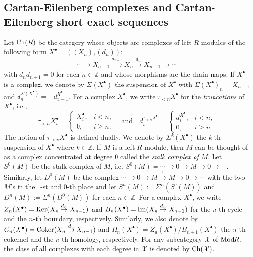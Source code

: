 \documentclass[reqno,12pt]{amsart}
\numberwithin{equation}{section}
\def\Ker{\mbox{\rm Ker}} \def\im{\mbox{\rm Im}} \def\Coker{\mbox{\rm Coker}}\def\mod{\mbox{\rm mod}}
\def\Im{\mbox{\rm Im}} \def\id{\mbox{\rm id}} \def\wid{\mbox{\rm w{\text -}id}} \def\FPid{\mbox{\rm FP{\text -}id}}
\def\Ch{\mbox{\rm Ch}}
\theoremstyle{plain}
\theoremstyle{definition}
\begin{document}
\subsection{Cartan-Eilenberg complexes and Cartan-Eilenberg short exact sequences}
Let $\Ch (R)$ be the category whose objects are complexes of left
$R$-modules of the following form $X^{\bullet}=((X_n),(d_n))$: $$ \cdots\to X_{n+1}
\stackrel{d_{n+1}}\longrightarrow X_n\stackrel{d_{n}}\longrightarrow X_{n-1}\to \cdots$$ with $d_{n}d_{n+1}=0$ for each
$n\in\mathbb{Z}$ and whose morphisms are the chain maps. If $X^{\bullet}$ is a complex, we
denote by $\Sigma(X^{\bullet})$ the suspension of $X^{\bullet}$ with
$\Sigma(X^{\bullet})_n=X_{n-1}$ and $d^{\Sigma(X^{\bullet})}_n=-d_{n-1}^{X^{\bullet}}$.
For a complex $X^{\bullet}$, we write $\tau_{<n}X^{\bullet}$ for the {\it truncations} of
$X^{\bullet}$, i.e.,
\begin{equation*}
    \tau_{<n}X^{\bullet}_i=\begin{cases}
        X^{\bullet}_i, & i<n, \\
        0, & i\geq n.
    \end{cases} \quad \text{and} \quad     d_i^{\tau_{<n}X^{\bullet}}=\begin{cases}
        d^{X^{\bullet}}_i, & i<n, \\
        0, & i\geq n.
    \end{cases}
\end{equation*}
The notion of $\tau_{>n}X^{\bullet}$ is defined dually.
We denote by $\Sigma^k(X^{\bullet})$ the $k$-th suspension of $X^{\bullet}$ where
$k\in\mathbb{Z}$. If $M$ is a left $R$-module, then $M$ can be thought of as a complex
concentrated at degree $0$ called the {\it stalk complex of $M$}.
Let $S^0(M)$ be the stalk complex of $M$, i.e. $S^0(M)=\cdots \to 0\to M\to 0\to \cdots$.
Similarly, let $D^0(M)$ be the complex $\cdots\to 0\to M\stackrel{1}\to M\to 0\to \cdots$ with
the two $M$'s in the $1$-st and $0$-th place and let $S^n(M):=\Sigma^n(S^0(M))$ and
$D^n(M):=\Sigma^n(D^0(M))$ for each $n\in\mathbb{Z}$.
For a complex $X^{\bullet}$, we write $Z_n(X^{\bullet})=\Ker(X_n\stackrel{d_{n}}\to
X_{n-1})$ and $B_n(X^{\bullet})=\Im(X_n\stackrel{d_{n}}\to X_{n-1})$ for the $n$-th cycle
and the $n$-th boundary, respectively. Similarly, we also denote by
$C_n(X^{\bullet})=\Coker(X_n\stackrel{d_{n}}\to X_{n-1})$ and
$H_n(X^{\bullet})=Z_n(X^{\bullet})/B_{n+1}(X^{\bullet})$ the $n$-th cokernel and the $n$-th
homology, respectively. For any subcategory $\mathcal{X}$ of $\mbox{\rm Mod} R$, the class of all
complexes with each degree in $\mathcal{X}$ is denoted by $\Ch(\mathcal{X})$.
\end{document}
